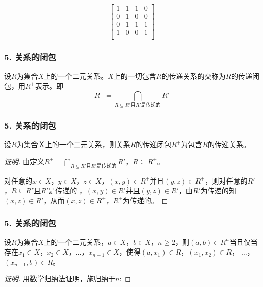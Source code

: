 \documentclass{beamer}
\begin{document}
\begin{CJK*}{UTF8}{gbsn}
\begin{frame}
  \centering
\pause
\[
  \begin{bmatrix}
    1&1&1&0\\
    0&1&0&0\\
    0&1&1&1\\
    1&0&0&1\\
  \end{bmatrix}
\]
\end{frame}
\begin{frame}
  \frametitle{5. 关系的闭包}
  \begin{Def}
    设$R$为集合$X$上的一个二元关系。$X$上的一切包含$R$的传递关系的交称为$R$的传递闭包，用$R^+$表示。即
    \begin{equation*}
      R^+ = \bigcap_{R \subseteq R' \text{且} R'\text{是传递的}}R'
    \end{equation*}
  \end{Def}
\end{frame}
\begin{frame}
  \frametitle{5. 关系的闭包}
  \begin{Thm}
    设$R$为集合Ｘ上的一个二元关系，则关系$R$的传递闭包$R^+$为包含$R$的传递关系。
  \end{Thm}
  \pause
  \begin{proof}[证明]\justifying\let\raggedright\justifying
    \pause 由定义$R^+ = \bigcap_{R \subseteq R' \text{且} R'\text{是传递的}}R'$，$R\subseteq R^+$。

    \pause 对任意的$x\in X$，$y\in X$，$z\in X$，\pause $(x,y)\in R^+$并且$(y,z)\in R^+$，\pause 则对任意的$R'$，$R\subseteq R'$且$R'$是传递的
，\pause $(x,y)\in R'$并且$(y,z)\in R'$，\pause 由$R'$为传递的知$(x,z)\in R'$，\pause 从而$(x,z)\in R^+$，$R^+$为传递的。
  \end{proof}
\end{frame}

\begin{frame}
  \frametitle{5. 关系的闭包}
  \begin{Thm}
    设$R$为集合$X$上的一个二元关系，$a \in X$，$b \in X$，$n \geq 2$，则$(a,b) \in R^n$当且仅当存在$x_1\in X$，$x_2\in X$，$\ldots$，$x_{n-1}\in X$，使得$(a, x_1) \in R$，$(x_1, x_2)\in R$，  $\ldots$， $(x_{n-1}, b)\in R$。
  \end{Thm}
  \begin{proof}[证明]
  \pause 用数学归纳法证明，施归纳于$n$:


\end{proof}
\end{frame}
\end{CJK*}
\end{document}
